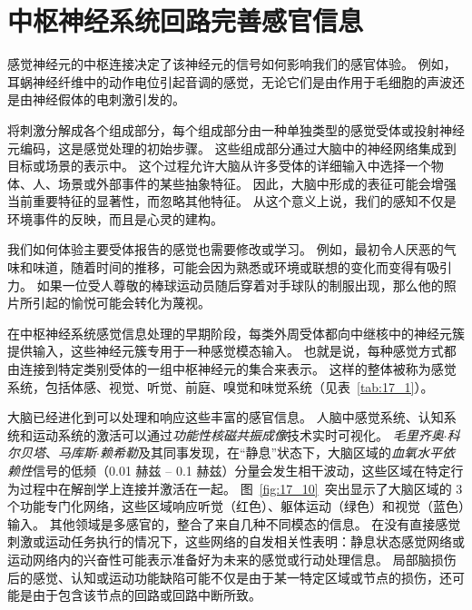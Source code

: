 \section{中枢神经系统回路完善感官信息}

感觉神经元的中枢连接决定了该神经元的信号如何影响我们的感官体验。 
例如，耳蜗神经纤维中的动作电位引起音调的感觉，无论它们是由作用于毛细胞的声波还是由神经假体的电刺激引发的。


将刺激分解成各个组成部分，每个组成部分由一种单独类型的感觉受体或投射神经元编码，这是感觉处理的初始步骤。
这些组成部分通过大脑中的神经网络集成到目标或场景的表示中。
这个过程允许大脑从许多受体的详细输入中选择一个物体、人、场景或外部事件的某些抽象特征。
因此，大脑中形成的表征可能会增强当前重要特征的显著性，而忽略其他特征。
从这个意义上说，我们的感知不仅是环境事件的反映，而且是心灵的建构。


我们如何体验主要受体报告的感觉也需要修改或学习。 
例如，最初令人厌恶的气味和味道，随着时间的推移，可能会因为熟悉或环境或联想的变化而变得有吸引力。
如果一位受人尊敬的棒球运动员随后穿着对手球队的制服出现，那么他的照片所引起的愉悦可能会转化为蔑视。


在中枢神经系统感觉信息处理的早期阶段，每类外周受体都向中继核中的神经元簇提供输入，这些神经元簇专用于一种感觉模态输入。
也就是说，每种感觉方式都由连接到特定类别受体的一组中枢神经元的集合来表示。
这样的整体被称为感觉系统，包括体感、视觉、听觉、前庭、嗅觉和味觉系统（见表~\ref{tab:17_1}）。


大脑已经进化到可以处理和响应这些丰富的感官信息。 
人脑中感觉系统、认知系统和运动系统的激活可以通过\textit{功能性核磁共振成像}技术实时可视化。
\textit{毛里齐奥$\cdot$科尔贝塔}、\textit{马库斯$\cdot$赖希勒}及其同事发现，在“静息”状态下，大脑区域的\textit{血氧水平依赖性}信号的低频（0.01 赫兹 – 0.1 赫兹）分量会发生相干波动，这些区域在特定行为过程中在解剖学上连接并激活在一起。
图~\ref{fig:17_10}~突出显示了大脑区域的 3 个功能专门化网络，这些区域响应听觉（红色）、躯体运动（绿色）和视觉（蓝色）输入。
其他领域是多感官的，整合了来自几种不同模态的信息。
在没有直接感觉刺激或运动任务执行的情况下，这些网络的自发相关性表明：静息状态感觉网络或运动网络内的兴奋性可能表示准备好为未来的感觉或行动处理信息。
局部脑损伤后的感觉、认知或运动功能缺陷可能不仅是由于某一特定区域或节点的损伤，还可能是由于包含该节点的回路或回路中断所致。


